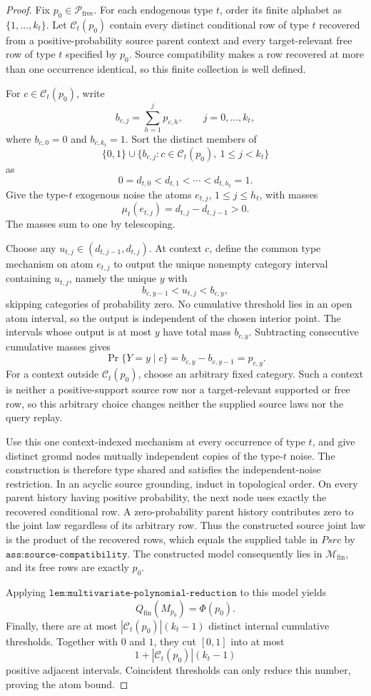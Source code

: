 \documentclass{article}
\begin{document}
\begin{proof}
Fix \(p_0\in\mathcal P_{\mathrm{free}}\).  For each endogenous type \(t\), order its finite alphabet as \(\{1,\ldots,k_t\}\).  Let \(\mathcal C_t(p_0)\) contain every distinct conditional row of type \(t\) recovered from a positive-probability source parent context and every target-relevant free row of type \(t\) specified by \(p_0\).  Source compatibility makes a row recovered at more than one occurrence identical, so this finite collection is well defined.

For \(c\in\mathcal C_t(p_0)\), write
\[
 b_{c,j}=\sum_{h=1}^{j}p_{c,h},
 \qquad j=0,\ldots,k_t,
\]
where \(b_{c,0}=0\) and \(b_{c,k_t}=1\).  Sort the distinct members of
\[
 \{0,1\}\cup
 \{b_{c,j}:c\in\mathcal C_t(p_0),\ 1\leq j<k_t\}
\]
as
\[
 0=d_{t,0}<d_{t,1}<\cdots<d_{t,h_t}=1.
\]
Give the type-\(t\) exogenous noise the atoms \(e_{t,j}\), \(1\leq j\leq h_t\), with masses
\[
 \mu_t(e_{t,j})=d_{t,j}-d_{t,j-1}>0.
\]
The masses sum to one by telescoping.

Choose any \(u_{t,j}\in(d_{t,j-1},d_{t,j})\).  At context \(c\), define the common type mechanism on atom \(e_{t,j}\) to output the unique nonempty category interval containing \(u_{t,j}\), namely the unique \(y\) with
\[
 b_{c,y-1}<u_{t,j}<b_{c,y},
\]
skipping categories of probability zero.  No cumulative threshold lies in an open atom interval, so the output is independent of the chosen interior point.  The intervals whose output is at most \(y\) have total mass \(b_{c,y}\).  Subtracting consecutive cumulative masses gives
\[
 \Pr\{Y=y\mid c\}=b_{c,y}-b_{c,y-1}=p_{c,y}.
\]
For a context outside \(\mathcal C_t(p_0)\), choose an arbitrary fixed category.  Such a context is neither a positive-support source row nor a target-relevant supported or free row, so this arbitrary choice changes neither the supplied source laws nor the query replay.

Use this one context-indexed mechanism at every occurrence of type \(t\), and give distinct ground nodes mutually independent copies of the type-\(t\) noise.  The construction is therefore type shared and satisfies the independent-noise restriction.  In an acyclic source grounding, induct in topological order.  On every parent history having positive probability, the next node uses exactly the recovered conditional row.  A zero-probability parent history contributes zero to the joint law regardless of its arbitrary row.  Thus the constructed source joint law is the product of the recovered rows, which equals the supplied table in \(Psrc\) by \(\texttt{ass:source-compatibility}\).  The constructed model consequently lies in \(\mathcal M_{\mathrm{fin}}\), and its free rows are exactly \(p_0\).

Applying \(\texttt{lem:multivariate-polynomial-reduction}\) to this model yields
\[
 Q_{\mathrm{fin}}(M_{p_0})=\Phi(p_0).
\]
Finally, there are at most \(|\mathcal C_t(p_0)|(k_t-1)\) distinct internal cumulative thresholds.  Together with \(0\) and \(1\), they cut \([0,1]\) into at most
\[
 1+|\mathcal C_t(p_0)|(k_t-1)
\]
positive adjacent intervals.  Coincident thresholds can only reduce this number, proving the atom bound.
\end{proof}
\end{document}

